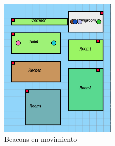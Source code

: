 \documentclass[a4paper ,12pt, onecolumn]{article}
\begin{document}
            \begin{center}
                \begin{figure}[]
                    \centering
                    \includegraphics[width=0.5\textwidth]{../../Memmory/images/house_simulation_3.PNG}
                    \caption{Beacons en movimiento}
                    \label{fig:mesh11}
                \end{figure}
            \end{center}   
\end{document}

